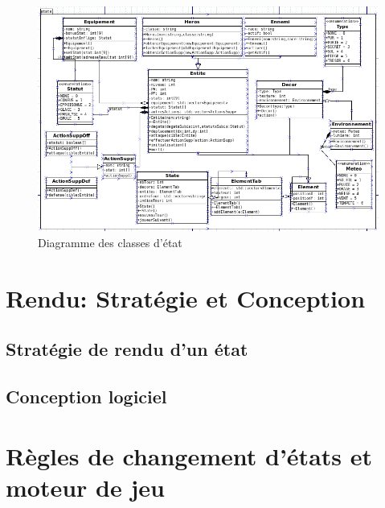\documentclass[a4paper,12pt]{article}
\begin{document}
\begin{figure}[hbt!]
    \centering
    \includegraphics[scale=0.8, angle=0]{images/State_dia.png}
    \caption{Diagramme des classes d'état}
    \label{fig:textDecor}
\end{figure}



\clearpage
\section{Rendu: Stratégie et Conception}

\subsection{Stratégie de rendu d'un état}


\subsection{Conception logiciel}


\clearpage
\section{Règles de changement d'états et moteur de jeu}
\end{document}
